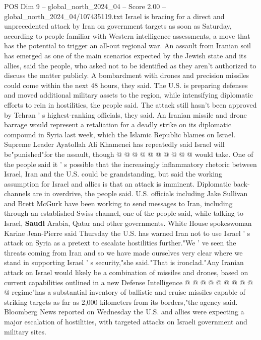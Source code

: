 \begin{textsample}{POS Dim 9 – global\_north\_2024\_04 – Score 2.00 – global\_north\_2024\_04/107435119.txt}  \label{ex:f9_pos_177}
Israel is bracing for a direct and unprecedented attack by Iran on government targets as soon as Saturday, according to people familiar with Western intelligence assessments, a move that has the potential to trigger an all-out regional war.
An assault from Iranian soil has emerged as one of the main scenarios expected by the Jewish state and its allies, said the people, who asked not to be identified as they aren't authorized to discuss the matter publicly.
A bombardment with drones and precision missiles could come within the next 48 hours, they said.
The U.S. is preparing defenses and moved additional military assets to the region, while intensifying diplomatic efforts to rein in hostilities, the people said.
The attack still hasn't been approved by Tehran ' s highest-ranking officials, they said.
An Iranian missile and drone barrage would represent a retaliation for a deadly strike on its diplomatic compound in Syria last week, which the Islamic Republic blames on Israel.
Supreme Leader Ayatollah Ali Khamenei has repeatedly said Israel will be"punished"for the assault, though @ @ @ @ @ @ @ @ @ @ would take.
One of the people said it ' s possible that the increasingly inflammatory rhetoric between Israel, Iran and the U.S. could be grandstanding, but said the working assumption for Israel and allies is that an attack is imminent.
Diplomatic back-channels are in overdrive, the people said.
U.S. officials including Jake Sullivan and Brett McGurk have been working to send messages to Iran, including through an established Swiss channel, one of the people said, while talking to Israel, \textbf{Saudi} Arabia, Qatar and other governments.
White House spokeswoman Karine Jean-Pierre said Thursday the U.S. has warned Iran not to use Israel ' s attack on Syria as a pretext to escalate hostilities further."We ' ve seen the threats coming from Iran and so we have made ourselves very clear where we stand in supporting Israel ' s security,"she said."That is ironclad."Any Iranian attack on Israel would likely be a combination of missiles and drones, based on current capabilities outlined in a new Defense Intelligence @ @ @ @ @ @ @ @ @ @ regime"has a substantial inventory of ballistic and cruise missiles capable of striking targets as far as 2,000 kilometers from its borders,"the agency said.
Bloomberg News reported on Wednesday the U.S. and allies were expecting a major escalation of hostilities, with targeted attacks on Israeli government and military sites.

\end{textsample}
